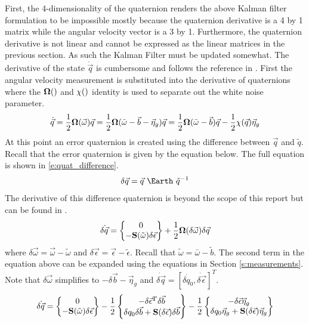 \documentclass{article}
\begin{document}
First, the 4-dimensionality of the quaternion renders the
above Kalman filter formulation to be impossible mostly because the
quaternion derivative is a 4 by 1 matrix while the angular velocity
vector is a 3 by 1. Furthermore, the quaternion derivative is not
linear and cannot be expressed as the linear matrices in the previous
section. As such the Kalman Filter must be updated somewhat. The
derivative of the state $\dot{\vec{q}}$ is cumbersome and follows the
reference in \cite{Liu_Estimation}. First the angular 
velocity measurement is substituted into the derivative of
quaternions where the ${\bf \Omega}()$ and ${\bf \chi}()$ identity is used to
separate out the white noise parameter.
\begin{equation}
  \dot{\vec{q}} = \frac{1}{2}{\bf \Omega}(\vec{\omega})\vec{q} =
  \frac{1}{2}{\bf \Omega}(\bar{\omega}-\vec{b}-\vec{\eta}_g)\vec{q} =
  \frac{1}{2}{\bf \Omega}(\bar{\omega}-\vec{b})\vec{q} - \frac{1}{2}{\bf \chi}(\vec{q})\vec{\eta}_g
\end{equation}
At this point an error quaternion is created using the difference
between $\vec{q}$ and $\tilde{q}$. Recall that the error quaternion is
given by the equation below. The full equation is shown in
\ref{e:quat_difference}. 
\begin{equation}
  \delta \vec{q} = \vec{q}~\Earth~\tilde{q}^{-1}
\end{equation}
The derivative of this difference quaternion is beyond the scope of
this report but can be found in \cite{kalman_quat}.
\begin{equation}
  \dot{\delta \vec{q}} = \begin{Bmatrix} 0 \\ -{\bf
      S}(\tilde{\omega})\delta \vec{\epsilon} \end{Bmatrix} +
  \frac{1}{2}{\bf \Omega}(\delta \vec{\omega})\delta \vec{q}
\end{equation}
where $\delta \vec{\omega} = \vec{\omega} - \tilde{\omega}$ and
$\delta \vec{\epsilon} = \vec{\epsilon} - \tilde{\epsilon}$. Recall
that $\tilde{\omega} = \bar{\omega}-\tilde{b}$. The second term in the
equation above can be expanded using the equations in Section
\ref{s:measurements}. Note that $\delta \vec{\omega}$ simplifies to
$-\delta \vec{b} - \vec{\eta}_g$ and $\dot{\delta \vec{q}} = [\dot{\delta q_0},\dot{\delta
    \vec{\epsilon}}]^T$. 
\begin{equation}
  \dot{\delta \vec{q}} = \begin{Bmatrix} 0 \\ -{\bf
      S}(\tilde{\omega})\delta \vec{\epsilon} \end{Bmatrix} -
  \frac{1}{2}\begin{Bmatrix} -\delta \vec{\epsilon}^T\delta \vec{b}
    \\ \delta q_0 \delta \vec{b} + {\bf S}(\delta
    \vec{\epsilon})\delta \vec{b} \end{Bmatrix} -
  \frac{1}{2}\begin{Bmatrix} -\delta \vec{\epsilon} \vec{\eta}_g
    \\ \delta q_0 \vec{\eta}_g + {\bf S}(\delta
    \vec{\epsilon})\vec{\eta}_g \end{Bmatrix}
\end{equation}
\end{document}
